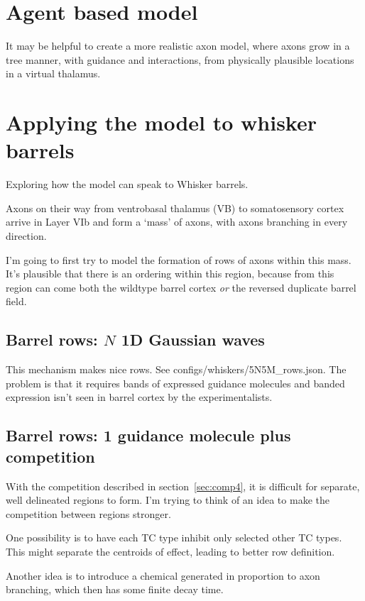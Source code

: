 \documentclass[11pt, a4paper]{article}
\newcommand{\code}[1]{\textsf{#1}}
\begin{document}
\section{Agent based model}

It may be helpful to create a more realistic axon model, where axons
grow in a tree manner, with guidance and interactions, from physically
plausible locations in a virtual thalamus.

\section{Applying the model to whisker barrels}

Exploring how the model can speak to Whisker barrels.

Axons on their way from ventrobasal thalamus (VB) to somatosensory
cortex arrive in Layer VIb and form a `mass' of axons, with axons
branching in every direction.

I'm going to first try to model the formation of rows of axons within
this mass. It's plausible that there is an ordering within this
region, because from this region can come both the wildtype barrel
cortex \emph{or} the reversed duplicate barrel field.

\subsection{Barrel rows: $N$ 1D Gaussian waves}

This mechanism makes nice
rows. See \code{configs/whiskers/5N5M\_rows.json}. The problem is that
it requires bands of expressed guidance molecules and banded
expression isn't seen in barrel cortex by the experimentalists.

\subsection{Barrel rows: 1 guidance molecule plus competition}

With the competition described in section~\ref{sec:comp4}, it is
difficult for separate, well delineated regions to form. I'm trying to
think of an idea to make the competition between regions stronger.

One possibility is to have each TC type inhibit only selected other TC
types. This might separate the centroids of effect, leading to better
row definition.

Another idea is to introduce a chemical generated in proportion to
axon branching, which then has some finite decay time.
\end{document}
